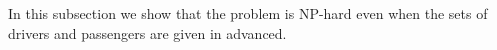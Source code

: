 In this subsection we show that the problem is NP-hard even when the sets of
drivers and passengers are given in advanced.
